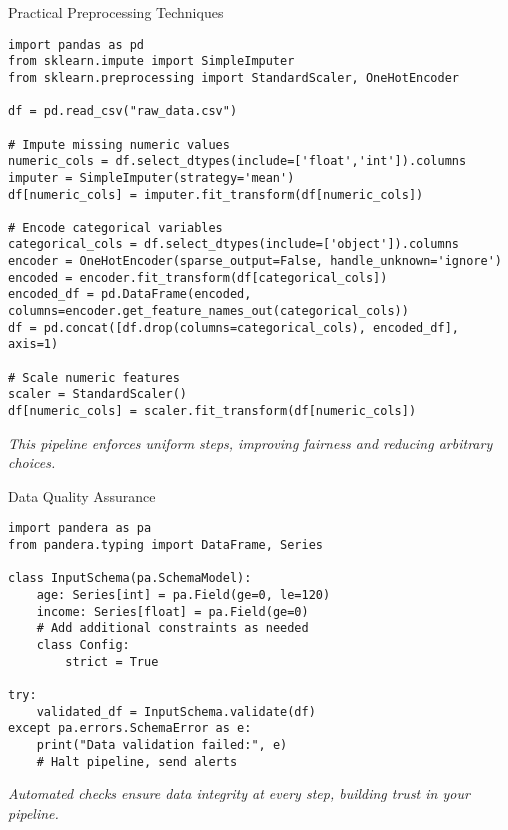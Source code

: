 \documentclass[aspectratio=169]{beamer}
\begin{document}
\begin{frame}{Practical Preprocessing Techniques}
\begin{verbatim}
import pandas as pd
from sklearn.impute import SimpleImputer
from sklearn.preprocessing import StandardScaler, OneHotEncoder

df = pd.read_csv("raw_data.csv")

# Impute missing numeric values
numeric_cols = df.select_dtypes(include=['float','int']).columns
imputer = SimpleImputer(strategy='mean')
df[numeric_cols] = imputer.fit_transform(df[numeric_cols])

# Encode categorical variables
categorical_cols = df.select_dtypes(include=['object']).columns
encoder = OneHotEncoder(sparse_output=False, handle_unknown='ignore')
encoded = encoder.fit_transform(df[categorical_cols])
encoded_df = pd.DataFrame(encoded, columns=encoder.get_feature_names_out(categorical_cols))
df = pd.concat([df.drop(columns=categorical_cols), encoded_df], axis=1)

# Scale numeric features
scaler = StandardScaler()
df[numeric_cols] = scaler.fit_transform(df[numeric_cols])
\end{verbatim}

\emph{This pipeline enforces uniform steps, improving fairness and reducing arbitrary choices.}
\end{frame}


\begin{frame}{Data Quality Assurance}
\begin{verbatim}
import pandera as pa
from pandera.typing import DataFrame, Series

class InputSchema(pa.SchemaModel):
    age: Series[int] = pa.Field(ge=0, le=120)
    income: Series[float] = pa.Field(ge=0)
    # Add additional constraints as needed
    class Config:
        strict = True

try:
    validated_df = InputSchema.validate(df)
except pa.errors.SchemaError as e:
    print("Data validation failed:", e)
    # Halt pipeline, send alerts
\end{verbatim}

\emph{Automated checks ensure data integrity at every step, building trust in your pipeline.}
\end{frame}
\end{document}

